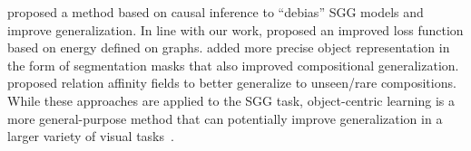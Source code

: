 \citet{tang2020unbiased} proposed a method based on causal inference to ``debias'' SGG models and improve generalization. In line with our work, \citet{suhail2021energy} proposed an improved loss function based on energy defined on graphs. \citet{khandelwal2021segmentation} added more precise object representation in the form of segmentation masks that also improved compositional generalization. \citet{liu2021fully} proposed relation affinity fields to better generalize to unseen/rare compositions. While these approaches are applied to the SGG task, object-centric learning is a more general-purpose method that can potentially improve generalization in a larger variety of visual tasks~\citep{locatello2020object,dittadi2021generalization}.